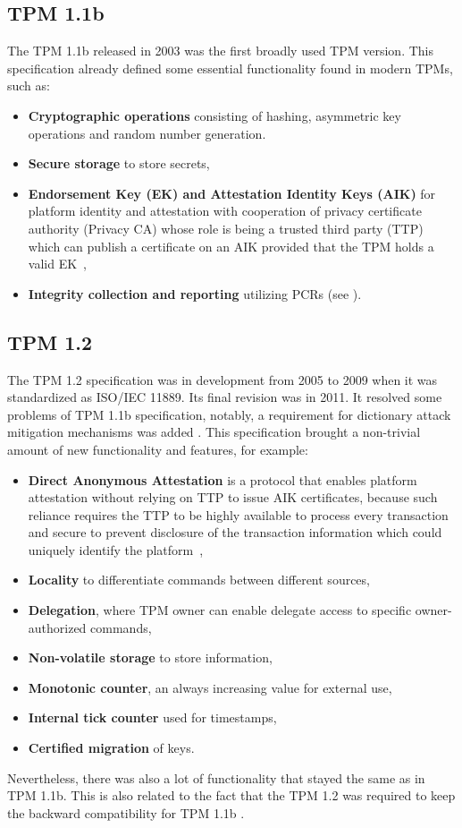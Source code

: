 \subsection{TPM 1.1b}
The TPM 1.1b released in 2003 was the first broadly used TPM version. This specification already defined some essential functionality found in modern TPMs, such as:
\begin{itemize}
    \item \textbf{Cryptographic operations} consisting of hashing, asymmetric key operations and random number generation.
    \item \textbf{Secure storage} to store secrets,
    \item \textbf{Endorsement Key (EK) and Attestation Identity Keys (AIK)} for platform identity and attestation with cooperation of privacy certificate authority (Privacy CA) whose role is being a trusted third party (TTP) which can publish a certificate on an AIK provided that the TPM holds a valid EK~\cite{chenPrivacyCA},
    \item \textbf{Integrity collection and reporting} utilizing PCRs (see ).
\end{itemize}

\subsection{TPM 1.2}
The TPM 1.2 specification was in development from 2005 to 2009 when it was standardized as ISO/IEC 11889. Its final revision was in 2011. It resolved some problems of TPM 1.1b specification, notably, a requirement for dictionary attack mitigation mechanisms was added \cite[p.~36-37]{tcg_1.2_design_princ}. This specification brought a non-trivial amount of new functionality and features, for example:
\begin{itemize}
    \item \textbf{Direct Anonymous Attestation} is a protocol that enables platform attestation without relying on TTP to issue AIK certificates, because such reliance requires the TTP to be highly available to process every transaction and secure to prevent disclosure of the transaction information which could uniquely identify the platform~\cite{daaSpec, daaDesignAndImple},
    \item \textbf{Locality} to differentiate commands between different sources,
    \item \textbf{Delegation}, where TPM owner can enable delegate access to specific owner-authorized commands,
    \item \textbf{Non-volatile storage} to store information,
    \item \textbf{Monotonic counter}, an always increasing value for external use,
    \item \textbf{Internal tick counter} used for timestamps,
    \item \textbf{Certified migration} of keys.
\end{itemize}
Nevertheless, there was also a lot of functionality that stayed the same as in TPM 1.1b. This is also related to the fact that the TPM 1.2 was required to keep the backward compatibility for TPM 1.1b \cite[p.~169]{tcg_1.2_design_princ}.

